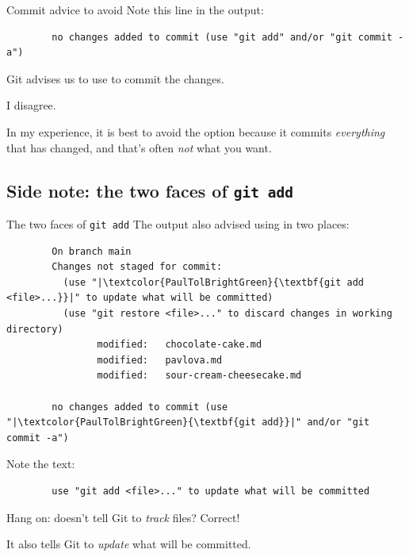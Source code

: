 \begin{frame}[fragile]{Commit advice to avoid}
    Note this line in the  output:
    \begin{verbatim}
        no changes added to commit (use "git add" and/or "git commit -a")
    \end{verbatim}

    Git advises us to use  to commit the changes.

    I disagree.

    In my experience, it is best to avoid the  option because it
    commits \emph{everything} that has changed, and that's often \emph{not}
    what you want.
\end{frame}

\subsection{Side note: the two faces of \texttt{git add}}

\begin{frame}[fragile]{The two faces of \texttt{git add}}
    The  output also advised using  in two
    places:
    \begin{verbatim}
        On branch main
        Changes not staged for commit:
          (use "|\textcolor{PaulTolBrightGreen}{\textbf{git add <file>...}}|" to update what will be committed)
          (use "git restore <file>..." to discard changes in working directory)
                modified:   chocolate-cake.md
                modified:   pavlova.md
                modified:   sour-cream-cheesecake.md

        no changes added to commit (use "|\textcolor{PaulTolBrightGreen}{\textbf{git add}}|" and/or "git commit -a")
    \end{verbatim}

    Note the text:
    \begin{verbatim}
        use "git add <file>..." to update what will be committed
    \end{verbatim}

    Hang on: doesn't  tell Git to \emph{track} files?  Correct!

    It also tells Git to \emph{update} what will be committed.
\end{frame}

